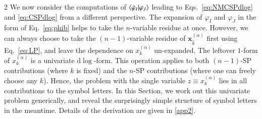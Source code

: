 \documentclass[fleqn]{2023SCGE}
\newcommand{\nd}{\mathrm{d}}
\begin{document}
\begin{multicols}{2}
We now consider the computations of $\braket{\dot{\varphi}_I|\varphi_J}$ leading to Eqs.~\eqref{eq:NMCSPdlog} and \eqref{eq:CSPdlog} from a different perspective. The expansion of $\varphi_I$ and $\varphi_J$ in the form of Eq.~\eqref{eq:phib} helps to take the $n$-variable residue at once. However, we can always choose to take the $(n-1)$-variable residue of $\bm{x}^{(\alpha)}_{\hat{k}}$ first using Eq.~\eqref{eq:LP}, and leave the dependence on $x^{(\alpha)}_k$ un-expanded. The leftover $1$-form of $x^{(\alpha)}_k$ is a univariate $\nd\log$-form. This operation applies to both $(n-1)$-SP contributions (where $k$ is fixed) and the $n$-SP contributions (where one can freely choose any $k$). Hence, the problem with the single variable $z \equiv x^{(\alpha)}_{k}$ lies in all contributions to the symbol letters. In this Section, we work out this univariate problem generically, and reveal the surprisingly simple structure of symbol letters in the meantime. {  Details of the derivation are given in \ref{app2}.}


\end{multicols}
\end{document}
